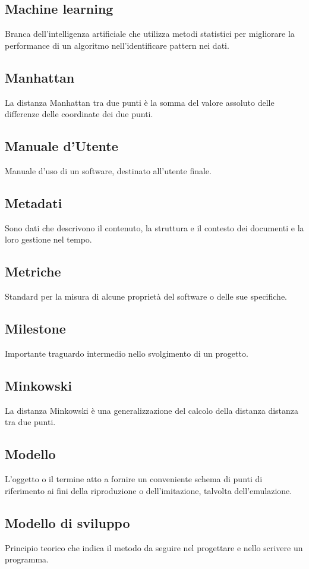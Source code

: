 \documentclass[../glossario.tex]{subfiles}
\begin{document}
\subsection*{Machine learning} 
Branca dell'intelligenza artificiale che utilizza metodi statistici per migliorare la performance di un algoritmo nell'identificare pattern nei dati.


\subsection*{Manhattan} 
La distanza Manhattan tra due punti è la somma del valore assoluto delle differenze delle coordinate dei due punti.

\subsection*{Manuale d'Utente} 
Manuale d'uso di un software, destinato all'utente finale.

\subsection*{Metadati}
Sono dati che descrivono il contenuto, la struttura e il contesto dei documenti e la loro gestione nel tempo.


\subsection*{Metriche} 
Standard per la misura di alcune proprietà del software o delle sue specifiche.

\subsection*{Milestone} 
Importante traguardo intermedio nello svolgimento di un progetto.

\subsection*{Minkowski} 
La distanza Minkowski è una generalizzazione del calcolo della distanza distanza tra due punti.

\subsection*{Modello} 
L'oggetto o il termine atto a fornire un conveniente schema di punti di riferimento ai fini della riproduzione o dell'imitazione, talvolta dell'emulazione.

\subsection*{Modello di sviluppo} 
Principio teorico che indica il metodo da seguire nel progettare e nello scrivere un programma.

    
\end{document}
